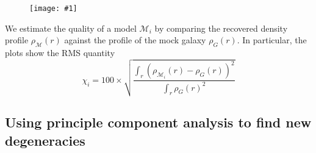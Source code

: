 \documentclass[onecolumn,galley]{mn2e}
\newcommand{\M}{\ensuremath{\mathscr{M}}}
\newcommand\plotone[1]{%
 \centering
 \leavevmode
 \texttt{[image: \#1]}%
}%
\newcommand\plottwo[2]{{%
 \centering
 \leavevmode
 \columnwidth=.45\columnwidth
 \texttt{[image: \#1]}%
 \hfil
 \texttt{[image: \#2]}%
}}%
\begin{document}
\begin{figure}
\plotone{AAresults.pdf}
\end{figure}

We estimate the quality of a model $\M_i$ by comparing the recovered
density profile $\rho_\M(r)$ against the profile of the mock galaxy $\rho_G(r)$.
In particular, the plots show the RMS quantity
%
\begin{equation}
  \chi_i = 100 \times \sqrt{\frac{\int_r (\rho_{\M_i}(r) - \rho_G(r))^2}{\int_r \rho_G(r)^2}}
\end{equation}


\subsection{Using principle component analysis to find new degeneracies}

\end{document}
